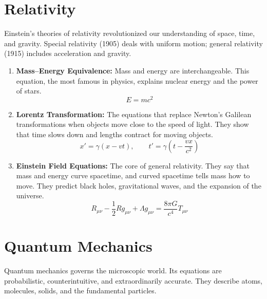 \section*{Relativity}

Einstein's theories of relativity revolutionized our understanding of space, time, and gravity. Special relativity (1905) deals with uniform motion; general relativity (1915) includes acceleration and gravity.

\begin{enumerate}

\item \textbf{Mass--Energy Equivalence:} Mass and energy are interchangeable. This equation, the most famous in physics, explains nuclear energy and the power of stars.
\[
E = mc^2
\]

\item \textbf{Lorentz Transformation:} The equations that replace Newton's Galilean transformations when objects move close to the speed of light. They show that time slows down and lengths contract for moving objects.
\[
x' = \gamma(x - vt), \qquad t' = \gamma\left(t - \frac{vx}{c^2}\right)
\]

\item \textbf{Einstein Field Equations:} The core of general relativity. They say that mass and energy curve spacetime, and curved spacetime tells mass how to move. They predict black holes, gravitational waves, and the expansion of the universe.
\[
R_{\mu\nu} - \frac{1}{2}Rg_{\mu\nu} + \Lambda g_{\mu\nu} = \frac{8\pi G}{c^4}T_{\mu\nu}
\]

\end{enumerate}

\section*{Quantum Mechanics}

Quantum mechanics governs the microscopic world. Its equations are probabilistic, counterintuitive, and extraordinarily accurate. They describe atoms, molecules, solids, and the fundamental particles.

